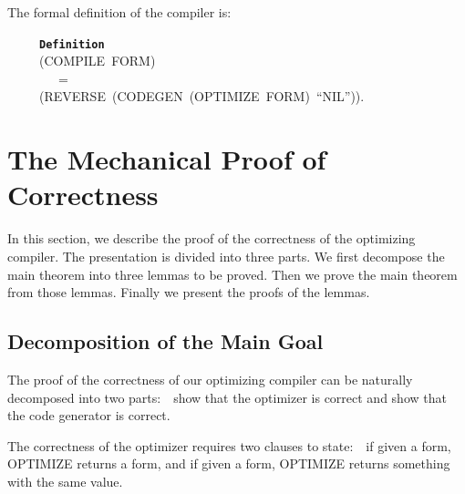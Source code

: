 \documentclass[11pt]{book}
\newenvironment{pubasis}{\begin{flushleft}\ttfamily\small}{\normalsize\rmfamily\end{flushleft}}
\newcommand{\axiomordefinition}[1]{\vspace{6pt}\texttt{\textbf{#1}}}
\newcommand{\pubdefaulttextsize}{\large}
\begin{document}
The formal definition of the compiler is:
\begin{pubasis}
~~~~~\axiomordefinition{Definition}\\
~~~~~(COMPILE~FORM)\\
~~~~~~~~=\\
~~~~~(REVERSE~(CODEGEN~(OPTIMIZE~FORM)~``NIL'')).\\
\end{pubasis}
\section{The Mechanical Proof of Correctness}
\pubdefaulttextsize
In this section, we describe the proof of the correctness of
the optimizing compiler.  The presentation is divided into three parts.
We first decompose the main theorem into three lemmas to be proved.
Then we prove the main theorem from those
lemmas.  Finally we present the proofs of the lemmas.
\subsection{Decomposition of the Main Goal}
\pubdefaulttextsize
The proof of the correctness of our optimizing compiler can be
naturally decomposed into two parts:~~show that the optimizer is correct
and show that the code generator is correct.

The correctness of the optimizer requires two clauses to state:~~if given
a form, OPTIMIZE returns a form, and if given a form, OPTIMIZE returns something
with the same value.
\end{document}
